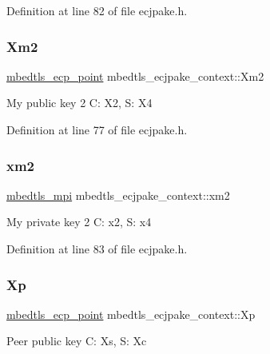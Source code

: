 Definition at line 82 of file ecjpake.\+h.

\mbox{\label{structmbedtls__ecjpake__context_a55676584cea41d167008b594748ca0d5}} 
\subsubsection{\texorpdfstring{Xm2}{Xm2}}
{\footnotesize\ttfamily \mbox{\hyperlink{structmbedtls__ecp__point}{mbedtls\+\_\+ecp\+\_\+point}} mbedtls\+\_\+ecjpake\+\_\+context\+::\+Xm2}

My public key 2 C\+: X2, S\+: X4 

Definition at line 77 of file ecjpake.\+h.

\mbox{\label{structmbedtls__ecjpake__context_ae1769cd75e437d673b4a49fc0d01bafc}} 
\subsubsection{\texorpdfstring{xm2}{xm2}}
{\footnotesize\ttfamily \mbox{\hyperlink{structmbedtls__mpi}{mbedtls\+\_\+mpi}} mbedtls\+\_\+ecjpake\+\_\+context\+::xm2}

My private key 2 C\+: x2, S\+: x4 

Definition at line 83 of file ecjpake.\+h.

\mbox{\label{structmbedtls__ecjpake__context_a8f830784980935408a08b5a7e37f7a88}} 
\subsubsection{\texorpdfstring{Xp}{Xp}}
{\footnotesize\ttfamily \mbox{\hyperlink{structmbedtls__ecp__point}{mbedtls\+\_\+ecp\+\_\+point}} mbedtls\+\_\+ecjpake\+\_\+context\+::\+Xp}

Peer public key C\+: Xs, S\+: Xc 

